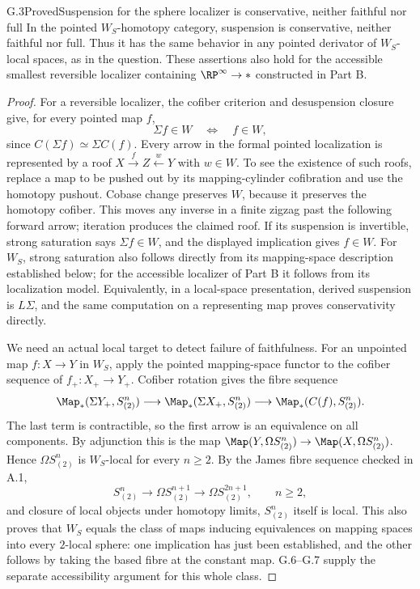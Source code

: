 \begin{claim}{G.3}{Proved}{Suspension for the sphere localizer is conservative, neither faithful nor full}
In the pointed $W_S$-homotopy category, suspension is conservative, neither faithful nor full. Thus it has the same behavior in any pointed derivator of $W_S$-local spaces, as in the question. These assertions also hold for the accessible smallest reversible localizer containing $\RP^\infty\to *$ constructed in Part B.
\end{claim}
\begin{proof}
For a reversible localizer, the cofiber criterion and desuspension closure give, for every pointed map $f$,
\[
 \Sigma f\in W\quad\Longleftrightarrow\quad f\in W,
\]
since $C(\Sigma f)\simeq\Sigma C(f)$. Every arrow in the formal pointed localization is represented by a roof $X\xrightarrow{f}Z\xleftarrow{w}Y$ with $w\in W$. To see the existence of such roofs, replace a map to be pushed out by its mapping-cylinder cofibration and use the homotopy pushout. Cobase change preserves $W$, because it preserves the homotopy cofiber. This moves any inverse in a finite zigzag past the following forward arrow; iteration produces the claimed roof. If its suspension is invertible, strong saturation says $\Sigma f\in W$, and the displayed implication gives $f\in W$. For $W_S$, strong saturation also follows directly from its mapping-space description established below; for the accessible localizer of Part B it follows from its localization model. Equivalently, in a local-space presentation, derived suspension is $L\Sigma$, and the same computation on a representing map proves conservativity directly.

We need an actual local target to detect failure of faithfulness. For an unpointed map $f:X\to Y$ in $W_S$, apply the pointed mapping-space functor to the cofiber sequence of $f_+:X_+\to Y_+$. Cofiber rotation gives the fibre sequence
\[
 \Map_*(\Sigma Y_+,S^n_{(2)})\longrightarrow
 \Map_*(\Sigma X_+,S^n_{(2)})\longrightarrow
 \Map_*(C(f),S^n_{(2)}).
\]
The last term is contractible, so the first arrow is an equivalence on all components. By adjunction this is the map $\Map(Y,\Omega S^n_{(2)})\to\Map(X,\Omega S^n_{(2)})$. Hence $\Omega S^n_{(2)}$ is $W_S$-local for every $n\geq2$. By the James fibre sequence checked in A.1,
\[
 S^n_{(2)}\longrightarrow\Omega S^{n+1}_{(2)}
          \longrightarrow\Omega S^{2n+1}_{(2)},\qquad n\geq2,
\]
and closure of local objects under homotopy limits, $S^n_{(2)}$ itself is local. This also proves that $W_S$ equals the class of maps inducing equivalences on mapping spaces into every $2$-local sphere: one implication has just been established, and the other follows by taking the based fibre at the constant map. G.6--G.7 supply the separate accessibility argument for this whole class.


\end{proof}
